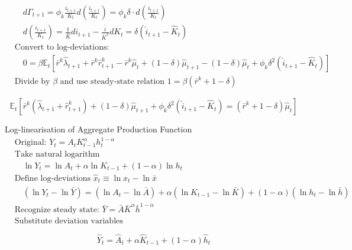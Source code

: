 \documentclass[11pt,preprint]{elsarticle}
\numberwithin{equation}{section}
\numberwithin{figure}{section}
\numberwithin{table}{section}
\begin{document}
\begin{align*}
& \quad d\Gamma_{t+1} = \phi_k \frac{i_{t+1}}{K_t} d\left( \frac{i_{t+1}}{K_t} \right) = \phi_k \delta \cdot d\left( \frac{i_{t+1}}{K_t} \right) \\[6pt]
& \quad d\left( \frac{i_{t+1}}{K_t} \right) = \frac{1}{\bar{K}} di_{t+1} - \frac{\bar{i}}{\bar{K}^2} dK_t = \delta (\hat{i}_{t+1} - \hat{K}_t) \\[6pt]
& \text{Convert to log-deviations:} \\
& \quad 0 = \beta \mathbb{E}_t \left[ \bar{r}^k \hat{\lambda}_{t+1} + \bar{r}^k \hat{r}^k_{t+1} - \bar{r}^k \hat{\mu}_t + (1-\delta) \hat{\mu}_{t+1} - (1-\delta) \hat{\mu}_t + \phi_k \delta^2 (\hat{i}_{t+1} - \hat{K}_t) \right] \\[6pt]
& \text{Divide by } \beta \text{ and use steady-state relation } 1 = \beta(\bar{r}^k + 1 - \delta)
\end{align*}

\begin{equation}\label{foc_K_linearised_app}
\boxed{\mathbb{E}_t \left[ \bar{r}^k (\hat{\lambda}_{t+1} + \hat{r}^k_{t+1}) + (1-\delta) \hat{\mu}_{t+1} + \phi_k \delta^2 (\hat{i}_{t+1} - \hat{K}_t) = (\bar{r}^k + 1 - \delta) \hat{\mu}_t \right]}
\end{equation}

Log-linearisation of Aggregate Production Function \begin{align*}
& \text{Original: } Y_t = A_t K_{t-1}^{\alpha} h_t^{1-\alpha} \\[6pt]
& \text{Take natural logarithm} \\
& \quad \ln Y_t = \ln A_t + \alpha \ln K_{t-1} + (1-\alpha) \ln h_t \\[6pt]
& \text{Define log-deviations } \hat{x}_t \equiv \ln x_t - \ln \bar{x} \\
& \quad (\ln Y_t - \ln \bar{Y}) = (\ln A_t - \ln \bar{A}) + \alpha (\ln K_{t-1} - \ln \bar{K}) + (1-\alpha) (\ln h_t - \ln \bar{h}) \\[6pt]
& \text{Recognize steady state: } \bar{Y} = \bar{A} \bar{K}^{\alpha} \bar{h}^{1-\alpha} \\[6pt]
& \text{Substitute deviation variables}
\end{align*}

\begin{equation}\label{aggregate_production_linearised_app}
\boxed{\hat{Y}_t = \hat{A}_t + \alpha \hat{K}_{t-1} + (1-\alpha) \hat{h}_t}
\end{equation}
\end{document}
